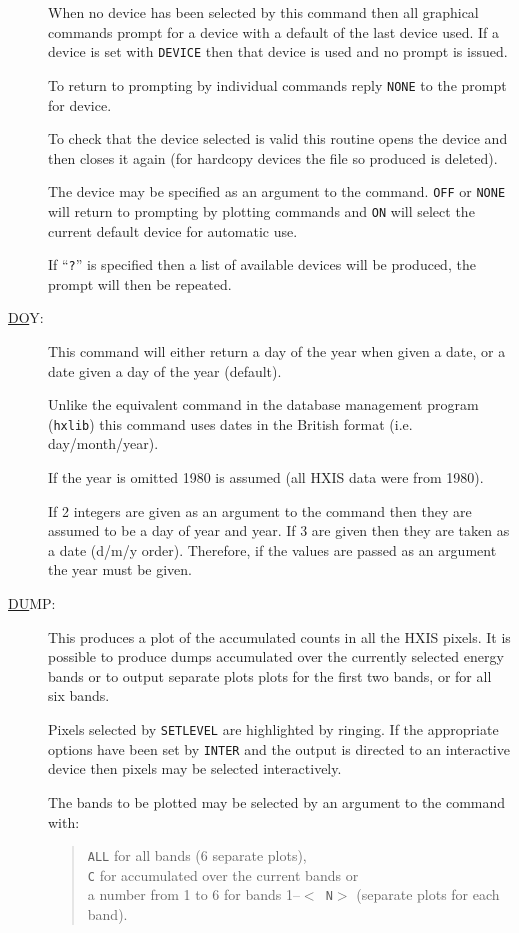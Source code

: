 \begin{description}
When no device has been selected by this command then all graphical
commands prompt for a device with a default of the last device used. If
a device is set with {\tt DEVICE} then that device is used and no
prompt is issued.

To return to prompting by individual commands reply {\tt NONE} to the
prompt for device.

To check that the device selected is valid this routine opens the
device and then closes it again (for hardcopy devices the file so
produced is deleted).

The device may be specified as an argument to the command. {\tt OFF} or
{\tt NONE} will return to prompting by plotting commands and {\tt ON}
will select the current default device for automatic use.

If ``{\tt ?}'' is specified then a list of available devices will be
produced, the prompt will then be repeated.

\item[\underline{DO}Y: ] \label{do}
This command will either return a day of the year when given a date, or
a date given a day of the year (default).

Unlike the equivalent command in the database management program
(\verb!hxlib!)  this command uses dates in the British format (i.e.
day/month/year).

If the year is omitted 1980 is assumed (all HXIS data were from 1980).

If 2 integers are given as an argument to the command then they are
assumed to be a day of year and year. If 3 are given then they are
taken as a date (d/m/y order). Therefore, if the values are passed as
an argument the year must be given.

\item[\underline{DU}MP: ] \label{du}
This produces a plot of the accumulated counts in all the HXIS pixels.
It is possible to produce dumps accumulated over the currently selected
energy bands or to output separate plots plots for the first two bands,
or for all six bands.

Pixels selected by {\tt SETLEVEL} are highlighted by ringing. If the
appropriate options have been set by {\tt INTER} and the output is
directed to an interactive device then pixels may be selected
interactively.

The bands to be plotted may be selected by an argument to the command
with:
\begin{quote}
{\tt ALL} for all bands (6 separate plots),\\ {\tt C} for accumulated
over the current bands or\\ a number from 1 to 6 for bands 1--$<${\tt
N}$>$ (separate plots for each band).
\end{quote}


\end{description}
